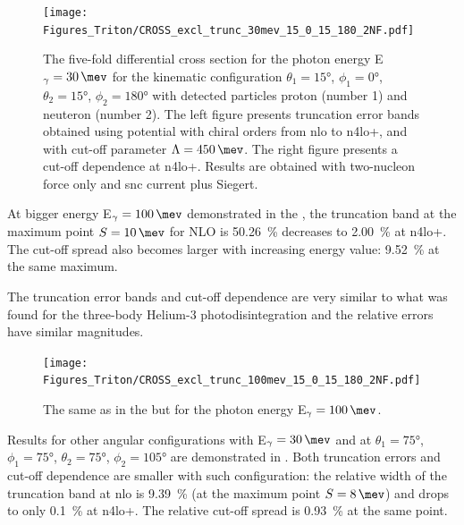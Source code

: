     \begin{figure}[h]
        \begin{center}
            \texttt{[image: Figures\_Triton/CROSS\_excl\_trunc\_30mev\_15\_0\_15\_180\_2NF.pdf]}
            \end{center}
            \caption{The five-fold differential cross section for the photon 
            energy E$_\gamma=\SI{30}{\mev}$ for the kinematic configuration
            $\theta_1 = \ang{15}$, $\phi_1 = \ang{0}$,
            $\theta_2 = \ang{15}$, $\phi_2 = \ang{180}$ with detected particles proton (number 1) and neuteron (number 2).
            The left figure presents truncation error bands obtained using potential
            with chiral orders from \gls{nlo} to \gls{n4lo+}, and with
            cut-off parameter $\Lambda=\SI{450}{\mev}$.
            The right figure presents a cut-off dependence at \gls{n4lo+}.
            Results are obtained with two-nucleon force only and \gls{snc} current plus Siegert.}
            \label{CROSS_Triton_EXCL_30_15_0_15_180}
    \end{figure}

    At bigger energy E$_\gamma=\SI{100}{\mev}$ demonstrated in the ,
    the truncation band at the maximum point $S=\SI{10}{\mev}$ for NLO is \SI{50.26}{\percent}
    decreases to \SI{2.00}{\percent} at \gls{n4lo+}.
    The cut-off spread also becomes larger with increasing energy value: \SI{9.52}{\percent}
    at the same maximum.

    The truncation error bands and cut-off dependence are very similar to what was found for
    the three-body Helium-3 photodisintegration and the relative errors 
    have similar magnitudes.

    \begin{figure}[h]
        \begin{center}
            \texttt{[image: Figures\_Triton/CROSS\_excl\_trunc\_100mev\_15\_0\_15\_180\_2NF.pdf]}
            \end{center}
            \caption{The same as in the  but for the photon energy
            E$_\gamma = \SI{100}{\mev}$.}
            \label{CROSS_Triton_EXCL_100mev_15_0_15_180}
    \end{figure}



    Results for other angular configurations with E$_\gamma=\SI{30}{\mev}$ and at 
    $\theta_1 = \ang{75}$, $\phi_1 = \ang{75}$,
    $\theta_2 = \ang{75}$, $\phi_2 = \ang{105}$ are
    demonstrated in .
    Both truncation errors and cut-off dependence are smaller with such configuration:
    the relative  width of the truncation band at \gls{nlo} is \SI{9.39}{\percent}
    (at the maximum point $S=\SI{8}{\mev}$) and drops to only \SI{0.1}{\percent}
    at \gls{n4lo+}. The relative cut-off spread is \SI{0.93}{\percent} at the same point.

